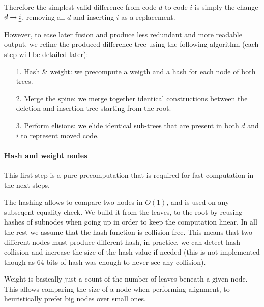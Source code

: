 \documentclass[a4paper,11pt]{article}
\newcommand\del[1]{\text{\st{$#1$}}}
\newcommand\ins[1]{\text{\ul{$#1$}}}
\newcommand\change[2]{\del{#1} \rightarrow \ins{#2}}
\begin{document}
 Therefore the simplest valid difference from code $d$ to code $i$
is simply the change $\change{d}{i}$, removing all $d$ and inserting $i$ as a
replacement.

 However, to ease later fusion and produce less redundant and more readable
output, we refine the produced difference tree using the following algorithm
(each step will be detailed later):
\begin{itemize}
 \item[1.] Hash \& weight: we precompute a weigth and a hash for each node of
both trees.
 \item[2.] Merge the spine: we merge together identical constructions between
the deletion and insertion tree starting from the root.
 \item[3.] Perform elisions: we elide identical sub-trees that are present in
both $d$ and $i$ to represent moved code.
\end{itemize}

\paragraph{Hash and weight nodes}
This first step is a pure precomputation that is required for fast computation
in the next steps.

The hashing allows to compare two nodes in $O(1)$, and is used on any
subseqent equality check. We build it from the leaves, to the root by reusing
hashes of subnodes when going up in order to keep the computation linear.
In all the rest we assume that the hash function is collision-free. This means
that two different nodes must produce different hash, in practice, we can
detect hash collision and increase the size of the hash value if needed (this
is not implemented though as 64 bits of hash was enough to never see any
collision).

Weight is basically just a count of the number of leaves beneath a given node.
This allows comparing the size of a node when performing alignment, to
heuristically prefer big nodes over small ones.
\end{document}
